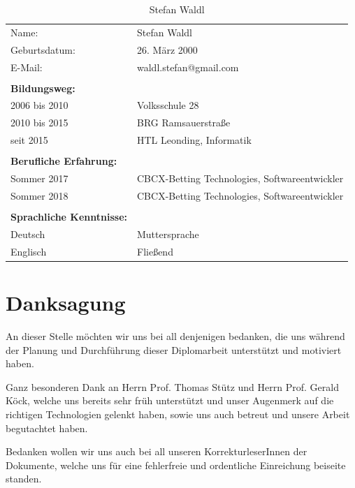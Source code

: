 \begin{table}[htb]
\begin{tabular}{ll}
Name:                            & Stefan Waldl          		 \\
Geburtsdatum:                    & 26. März 2000                 \\
E-Mail:                          & waldl.stefan@gmail.com        \\
                                 &                               \\
\textbf{Bildungsweg:}            &                               \\  
2006 bis 2010                    & Volksschule 28      		     \\
2010 bis 2015                    & BRG Ramsauerstraße    	 	 \\
seit 2015                        & HTL Leonding, Informatik      \\
                                 &                               \\
\textbf{Berufliche Erfahrung:}   &                               \\
Sommer 2017                      & CBCX-Betting Technologies, Softwareentwickler \\
Sommer 2018                      & CBCX-Betting Technologies, Softwareentwickler \\
                                 &                               \\
\textbf{Sprachliche Kenntnisse:} &                               \\
Deutsch                          & Muttersprache                 \\
Englisch                         & Fließend                     
\end{tabular}
\caption{Stefan Waldl}
\end{table}
\pagebreak
 

\section*{Danksagung}

An dieser Stelle möchten wir uns bei all denjenigen bedanken, die uns während der Planung und Durchführung dieser Diplomarbeit unterstützt und motiviert haben.

Ganz besonderen Dank an Herrn Prof. Thomas Stütz und Herrn Prof. Gerald Köck, welche uns bereits sehr früh unterstützt und unser Augenmerk auf die richtigen Technologien gelenkt haben, sowie uns auch betreut und unsere Arbeit begutachtet haben.

Bedanken wollen wir uns auch bei all unseren KorrekturleserInnen der Dokumente, welche uns für eine fehlerfreie und ordentliche Einreichung beiseite standen.